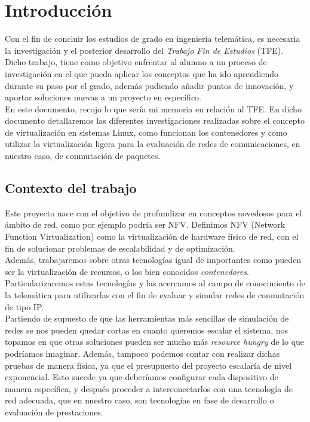 \documentclass[12pt]{article}
\begin{document}
	\pagebreak
	
	\section{Introducción}
	\noindent Con el fin de concluir los estudios de grado en ingeniería telemática, es necesaria la investigación y el posterior desarrollo del \textit{Trabajo Fin de Estudios} (TFE). Dicho trabajo, tiene como objetivo enfrentar al alumno a un proceso de investigación en el que pueda aplicar los conceptos que ha ido aprendiendo durante su paso por el grado, además pudiendo añadir puntos de innovación, y aportar soluciones nuevas a un proyecto en específico.\\
	
	\noindent En este documento, recojo lo que sería mi memoria en relación al TFE. En dicho documento detallaremos las diferentes investigaciones realizadas sobre el concepto de virtualización en sistemas Linux, como funcionan los contenedores y como utilizar la virtualización ligera para la evaluación de redes de comunicaciones, en nuestro caso, de conmutación de paquetes.
	
	\subsection{Contexto del trabajo}
	\noindent Este proyecto nace con el objetivo de profundizar en conceptos novedosos para el ámbito de red, como por ejemplo podría ser NFV. Definimos NFV (Network Function Virtualization) como la virtualización de hardware físico de red, con el fin de solucionar problemas de escalabilidad y de optimización.\\
	
	 \noindent Además, trabajaremos sobre otras tecnologías igual de importantes como pueden ser la virtualización de recursos, o los bien conocidos \textit{contenedores}. Particularizaremos estas tecnologías y las acercamos al campo de conocimiento de la telemática para utilizarlas con el fin de evaluar y simular redes de conmutación de tipo IP. \\
	
	\noindent Partiendo de supuesto de que las herramientas más sencillas de simulación de redes se nos pueden quedar cortas en cuanto queremos escalar el sistema, nos topamos en que otras soluciones pueden ser mucho más \textit{resource hungry} de lo que podríamos imaginar. Además, tampoco podemos contar con realizar dichas pruebas de manera física, ya que el presupuesto del proyecto escalaría de nivel exponencial. Esto sucede ya que deberíamos configurar cada dispositivo de manera específica, y después proceder a interconectarlos con una tecnología de red adecuada, que en nuestro caso, son tecnologías en fase de desarrollo o evaluación de prestaciones.\\
	
\end{document}

